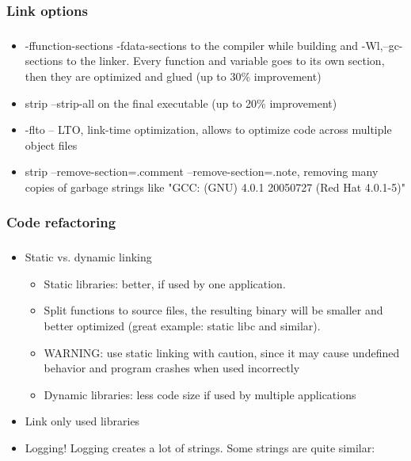 \documentclass{beamer}
\begin{document}
\subsubsection{Link options}
\begin{frame}
\frametitle{\subsubsecname}
\begin{itemize}
\item -ffunction-sections -fdata-sections to the compiler while building and -Wl,--gc-sections to the linker. Every function and variable goes to its own section, then they are optimized and glued (up to 30\% improvement)
\item strip --strip-all on the final executable (up to 20\% improvement)
\item -flto – LTO, link-time optimization, allows to optimize code across multiple object files
\item strip --remove-section=.comment –remove-section=.note, removing many copies of garbage strings like "GCC: (GNU) 4.0.1 20050727 (Red Hat 4.0.1-5)"
\end{itemize}
\end{frame}

\subsubsection{Code refactoring}
\begin{frame}
\frametitle{\subsubsecname}
\begin{itemize}
    \item Static vs. dynamic linking
    \begin{itemize} 
    	\item Static libraries: better, if used by one application. 
    	\item Split functions to source files, the resulting binary will be smaller and better optimized (great example: static libc and similar). 
    	\item WARNING: use static linking with caution, since it may cause undefined behavior and program crashes when used incorrectly
    	\item Dynamic libraries: less code size if used by multiple applications
	\end{itemize}
    \item Link only used libraries
    \item Logging! Logging creates a lot of strings. Some strings are quite similar:
\end{itemize}
\end{frame}
\end{document}
